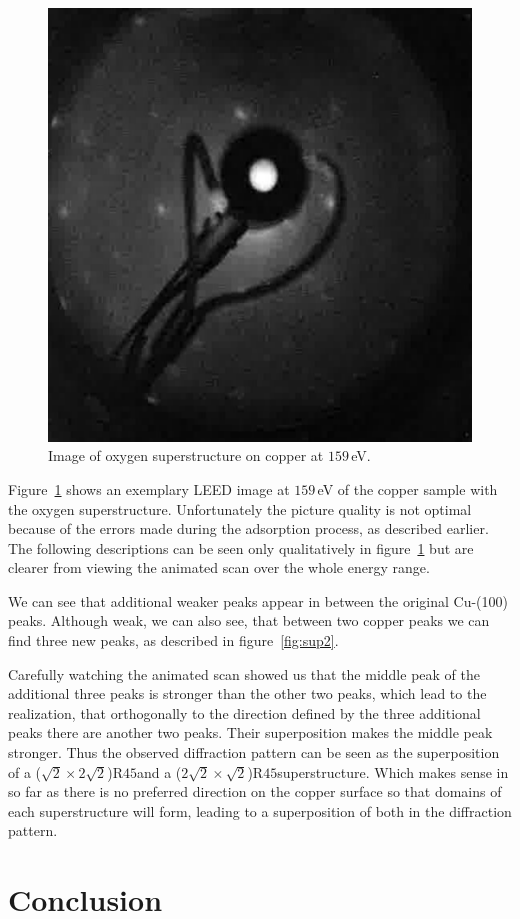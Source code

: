 \documentclass[a4paper,10pt]{scrartcl}
\begin{document}
\begin{figure}
\centering
\includegraphics[scale=0.4]{img/img_o2_159eV}
\caption{Image of oxygen superstructure on copper at $159\,$eV. \label{fig:imgo2}}
\end{figure}

Figure~\ref{fig:imgo2} shows an exemplary LEED image at $159\,$eV of the copper sample with the oxygen superstructure. Unfortunately the picture quality is not optimal because of the errors made during the adsorption process, as described earlier. The following descriptions can be seen only qualitatively in figure~\ref{fig:imgo2} but are clearer from viewing the animated scan over the whole energy range.

We can see that additional weaker peaks appear in between the original Cu-(100) peaks. Although weak, we can also see, that between two copper peaks we can find three new peaks, as described in figure~\ref{fig:sup2}. 

Carefully watching the animated scan showed us that the middle peak of the additional three peaks is stronger than the other two peaks, which lead to the realization, that orthogonally to the direction defined by the three additional peaks there are another two peaks. Their superposition makes the middle peak stronger. Thus the observed diffraction pattern can be seen as the superposition of a ($\sqrt{2} \times 2\sqrt{2}$)R$45$\textdegree and a ($2\sqrt{2} \times \sqrt{2}$)R$45$\textdegree superstructure. Which makes sense in so far as there is no preferred direction on the copper surface so that domains of each superstructure will form, leading to a superposition of both in the diffraction pattern.

\section{Conclusion}

\nocite{skript}
\nocite{henzler}
\nocite{ertl}
\nocite{straumanis}
\nocite{brian}



\end{document}
